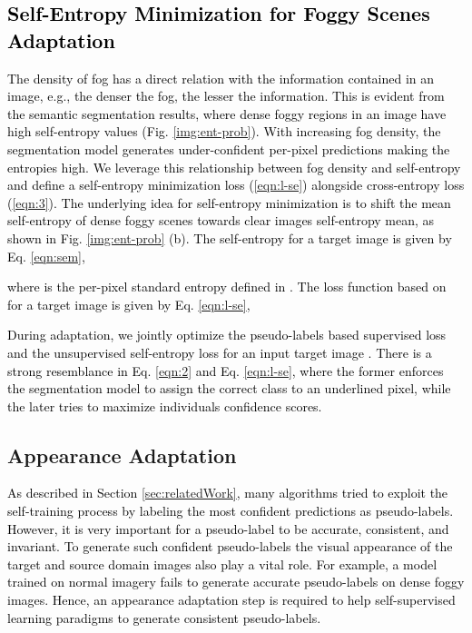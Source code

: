 \documentclass[final,5p,times,twocolumn]{elsarticle}
\begin{document}
\textcolor{black}{
\subsection{Self-Entropy Minimization for Foggy Scenes Adaptation}
\label{sec:sem}
The density of fog has a direct relation with the information contained in an image, e.g., the denser the fog, the lesser the information. 
\textcolor{black}{This is evident from the semantic segmentation results, where dense foggy regions in an image have high self-entropy values (Fig. \ref{img:ent-prob}).}
With increasing fog density, the segmentation model generates under-confident per-pixel predictions making the entropies high. We leverage this relationship between fog density and self-entropy and define a self-entropy minimization loss (\ref{eqn:l-se}) alongside cross-entropy loss (\ref{eqn:3}). 
The underlying idea for self-entropy minimization is to shift the mean self-entropy of dense foggy scenes towards clear images self-entropy mean, as shown in Fig. \ref{img:ent-prob} (b).  
The self-entropy  for a target image  is given by Eq. \ref{eqn:sem},

where  is the per-pixel standard entropy defined in \cite{shannon1948mathematical}.  
The loss function based on  for a target image  is given by Eq. \ref{eqn:l-se},

During adaptation, we jointly optimize the pseudo-labels based supervised loss  and the unsupervised self-entropy loss  for an input target image . There is a strong resemblance in Eq. \ref{eqn:2} and Eq. \ref{eqn:l-se}, where the former enforces the segmentation model to assign the correct class to an underlined pixel, while the later tries to maximize individuals confidence scores. }

\subsection{Appearance Adaptation}
\textcolor{black}{
As described in Section \ref{sec:relatedWork}, many algorithms tried to exploit the self-training process by labeling the most confident predictions as pseudo-labels. However, it is very important for a pseudo-label to be accurate, consistent, and invariant. 
To generate such confident pseudo-labels the visual appearance of the target and source domain images also play a vital role. For example, a model trained on normal imagery fails to generate accurate pseudo-labels on dense foggy images. 
Hence, an appearance adaptation step is required to help self-supervised learning paradigms to generate consistent pseudo-labels.} 
\end{document}
